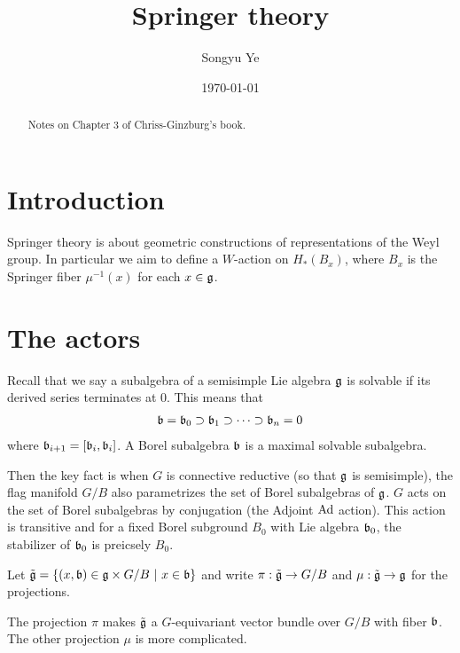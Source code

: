 \documentclass[12pt]{article}
\begin{document}
\rhead{\today}
\cfoot{\thepage}

\title{Springer theory}

\author{Songyu Ye}
\date{\today}
\maketitle


\begin{abstract}
Notes on Chapter 3 of Chriss-Ginzburg's book.
\end{abstract}

\tableofcontents

\section{Introduction}
Springer theory is about geometric constructions of representations of the Weyl group. In particular we aim to define a $W$-action on $H_*(B_x)$, where $B_x$ is the Springer fiber $\mu^{-1}(x)$ for each $x\in \mathfrak{g}$.

\section{The actors}
\begin{claim}
    Recall that we say a subalgebra of a semisimple Lie algebra $\mathfrak{g}$ is solvable if its derived series terminates at 0. This means that \begin{align*}
        \mathfrak{b} = \mathfrak{b}_0 \supset \mathfrak{b}_1 \supset \cdots \supset \mathfrak{b}_n = 0  
    \end{align*} where $\mathfrak{b}_{i+1} = [\mathfrak{b}_i, \mathfrak{b}_i]$.
A Borel subalgebra $\mathfrak{b}$ is a maximal solvable subalgebra. 

Then the key fact is when $G$ is connective reductive (so that $\mathfrak{g}$ is semisimple), the flag manifold $G/B$ also parametrizes the set of Borel subalgebras of $\mathfrak{g}$. $G$ acts on the set of Borel subalgebras by conjugation (the Adjoint $\operatorname{Ad}$ action). This action is transitive and for a fixed Borel subground $B_0$ with Lie algebra $\mathfrak{b}_0$, the stabilizer of $\mathfrak{b}_0$ is preicsely $B_0$.
\end{claim}
\begin{definition}
    Let $\tilde{\mathfrak{g}} = \{(x,\mathfrak{b}) \in \mathfrak{g} \times G/B \ \vert \  x\in \mathfrak{b}\}$ and write $\pi: \tilde{\mathfrak{g}} \to G/B$ and $\mu: \tilde{\mathfrak{g}} \to \mathfrak{g}$ for the projections. 
\end{definition}
The projection $\pi$ makes $\tilde{\mathfrak{g}}$ a $G$-equivariant vector bundle over $G/B$ with fiber $\mathfrak{b}$. The other projection $\mu$ is more complicated.
\end{document}
